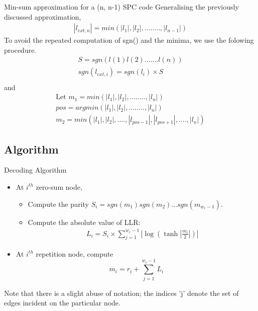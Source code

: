 \begin{frame}{Min-sum approximation for a (n, n-1) SPC code}
Generalising the previously discussed approximation, 
\begin{gather*}
    |l_{ext, n}| = min(|l_1|, |l_2|, ........, |l_{n-1}|)
\end{gather*}
To avoid the repeated computation of sgn() and the minima, we use the folowing procedure.
\begin{gather*}
    S = sgn(l(1) l(2) ....... l(n)) \\
    sgn(l_{ext, i}) = sgn(l_{i}) \times S \\
\end{gather*}
and
\begin{gather*}
    \text{Let }m_1 = min(|l_1|, |l_2|, ........, |l_n|) \\
    pos = argmin(|l_1|, |l_2|, ........, |l_n|) \\
    m_2 = min(|l_1|, |l_2|, ...., |l_{pos-1}|,  |l_{pos+1}|, ...., |l_n|)
\end{gather*}
\end{frame}

\subsection{Algorithm}
\begin{frame}{Decoding Algorithm}
    \begin{itemize}
        \item At $i^{th}$ zero-sum node, 
        \begin{itemize}
            \item Compute the parity $S_i = sgn(m_1)sgn(m_2)...sgn(m_{w_r-1})$.
            \item Compute the absolute value of LLR: 
            \begin{gather*}
                L_i = S_i \times \sum_{j = 1}^{w_r-1}\left|\log(\tanh\left|\frac{m_i}{2}\right|)\right|
            \end{gather*}
        \end{itemize}
        
        \item At $i^{th}$ repetition node, compute $$m_i = r_i + \sum_{j = 1}^{w_c-1} L_i$$
    \end{itemize}
    
Note that there is a slight abuse of notation; the indices 'j' denote the set of edges incident on the particular node.
\end{frame}

